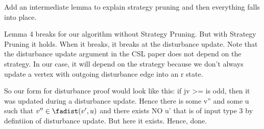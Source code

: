 Add an intermediate lemma to explain strategy pruning and then everything falls into place.

Lemma 4 breaks for our algorithm without Strategy Pruning. But with Strategy Pruning it holds. When it breaks, it breaks at the disturbance update. Note that the disturbance update argument in the CSL paper does not depend on the strategy. In our case, it will depend on the strategy because we don't always update a vertex with outgoing disturbance edge into an r state. 

So our form for disturbance proof would look like this:
if jv >= is odd, then it was updated during a disturbance update. Hence there is some v'' and some u such that $v'' \in \fadist(v',u)$ and there exists NO u' that is of input type 3 by defintiion of disturbance update. 
But here it exists. Hence, done.

